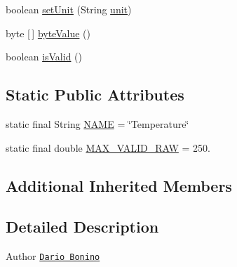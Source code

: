 \begin{DoxyCompactItemize}
\item 
boolean \hyperlink{classit_1_1polito_1_1elite_1_1enocean_1_1enj_1_1eep_1_1eep26_1_1attributes_1_1_e_e_p26_temperature_linear_a584dc2567c2db22e6b0fec233593f907}{set\+Unit} (String \hyperlink{classit_1_1polito_1_1elite_1_1enocean_1_1enj_1_1eep_1_1_e_e_p_attribute_a3fe5b3d613c30066354ad66eeb23b8ae}{unit})
\item 
byte \mbox{[}$\,$\mbox{]} \hyperlink{classit_1_1polito_1_1elite_1_1enocean_1_1enj_1_1eep_1_1eep26_1_1attributes_1_1_e_e_p26_temperature_linear_ac177c8c02096be3d21bfdbe523000d71}{byte\+Value} ()
\item 
boolean \hyperlink{classit_1_1polito_1_1elite_1_1enocean_1_1enj_1_1eep_1_1eep26_1_1attributes_1_1_e_e_p26_temperature_linear_afd894e8ec02e60081d8bb483f8e3f042}{is\+Valid} ()
\end{DoxyCompactItemize}
\subsection*{Static Public Attributes}
\begin{DoxyCompactItemize}
\item 
static final String \hyperlink{classit_1_1polito_1_1elite_1_1enocean_1_1enj_1_1eep_1_1eep26_1_1attributes_1_1_e_e_p26_temperature_linear_a06fca6591e0634e3474d2ce888b20e84}{N\+A\+ME} = \char`\"{}Temperature\char`\"{}
\item 
static final double \hyperlink{classit_1_1polito_1_1elite_1_1enocean_1_1enj_1_1eep_1_1eep26_1_1attributes_1_1_e_e_p26_temperature_linear_aa7cd99638156a4510c979de1121fb218}{M\+A\+X\+\_\+\+V\+A\+L\+I\+D\+\_\+\+R\+AW} = 250.
\end{DoxyCompactItemize}
\subsection*{Additional Inherited Members}


\subsection{Detailed Description}
\begin{DoxyAuthor}{Author}
\href{mailto:dario.bonino@gmail.com}{\tt Dario Bonino} 
\end{DoxyAuthor}


